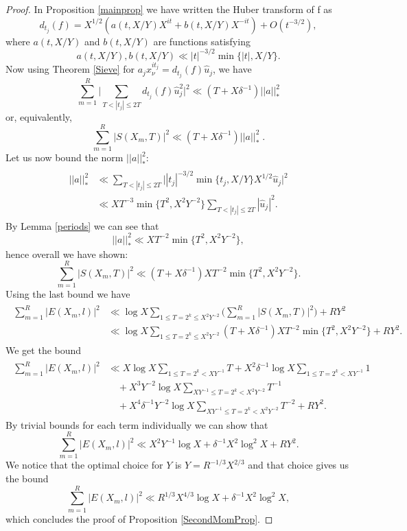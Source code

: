 \documentclass[a4paper,11pt]{amsart}
\theoremstyle{definition}
\begin{document}
\begin{proof}
In Proposition \ref{mainprop} we have written the Huber transform of f as
$$d_{t_j}(f)= X^{1/2}(a(t,X/Y)X^{it}+b(t,X/Y)X^{-it})+O(t^{-3/2}),$$
where $a(t,X/Y)$ and $b(t,X/Y)$ are functions satisfying 
$$a(t,X/Y),b(t,X/Y) \ll |t|^{-3/2}\min\{|t|,X/Y\}.$$
Now using Theorem \ref{Sieve} for $a_j x_{\nu}^{i t_j}=d_{t_j}(f)\hat{u}_j$, we have
$$\sum_{m=1}^R\Big|\sum_{T<|t_j|\le2T}d_{t_j}(f)\hat{u}_j^2\Big|^2 \ll (T+X\delta^{-1})||a||_*^2$$ 
or, equivalently,
$$\sum_{m=1}^R|S(X_m,T)|^2 \ll (T+X\delta^{-1})||a||_*^2 \; .$$
Let us now bound the norm $||a||_*^2$:
\begin{align}
    \begin{split}
        ||a||_*^2 &\ll \sum_{T<|t_j|\le 2T}\big||t_j|^{-3/2}\min\{t_j,X/Y\}X^{1/2}\hat{u}_j\big|^2 \\
        & \ll XT^{-3}\min\{T^2,X^2Y^{-2}\}\sum_{T<|t_j|\le2T}|\hat{u}_j|^2.
    \end{split}
\end{align}
By Lemma \ref{periods} we can see that 
$$||a||_*^2\ll XT^{-2}\min\{T^2,X^2Y^{-2}\},$$
hence overall we have shown:
$$\sum_{m=1}^R|S(X_m,T)|^2 \ll (T+X\delta^{-1})XT^{-2}\min\{T^2,X^2Y^{-2}\}.$$
Using the last bound we have
\begin{align}
    \begin{split}
        \sum_{m=1}^R|E(X_m,l)|^2 &\ll \log X \sum_{1\le T=2^k\le X^2Y^{-2}}\Bigg(\sum_{m=1}^{R}|S(X_m,T)|^2\Bigg)+RY^2\\
        &\ll \log X \sum_{1\le T=2^k\le X^2Y^{-2}}(T+X\delta^{-1})XT^{-2}\min\{T^2,X^2Y^{-2}\}+RY^2.
    \end{split}
\end{align}
We get the bound
\begin{align}
    \begin{split}
        \sum_{m=1}^R|E(X_m,l)|^2 &\ll X\log X\sum_{1\le T=2^k <XY^{-1}}T+X^2\delta^{-1}\log X\sum_{1\le T=2^k < XY^{-1}}1\\
        &\quad +X^3Y^{-2}\log X\sum_{XY^{-1}\le T=2^k < X^2Y^{-2}}T^{-1} \\
        &\quad + X^4\delta^{-1}Y^{-2}\log X\sum_{XY^{-1}\le T=2^k < X^2Y^{-2}}T^{-2}+RY^2.
    \end{split}
\end{align}
By trivial bounds for each term individually we can show that
$$\sum_{m=1}^R|E(X_m,l)|^2\ll X^2Y^{-1}\log X+\delta^{-1}X^2\log^2 X+RY^2.$$
We notice that the optimal choice for $Y$ is $Y=R^{-1/3}X^{2/3}$ and that choice gives us the bound
$$\sum_{m=1}^R|E(X_m,l)|^2\ll R^{1/3}X^{4/3}\log X+\delta^{-1}X^2\log^2 X,$$
which concludes the proof of Proposition \ref{SecondMomProp}.
\end{proof}
\end{document}

